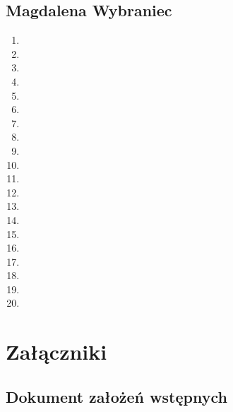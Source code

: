\documentclass{sprz}
\begin{document}
\section{Magdalena Wybraniec}
\begin{enumerate}
  \item
  \item
  \item
  \item
  \item
  \item
  \item
  \item
  \item
  \item
  \item
  \item
  \item
  \item
  \item
  \item
  \item
  \item
  \item
  \item
\end{enumerate}


\chapter{Załączniki}

\section{Dokument założeń wstępnych}
\end{document}
